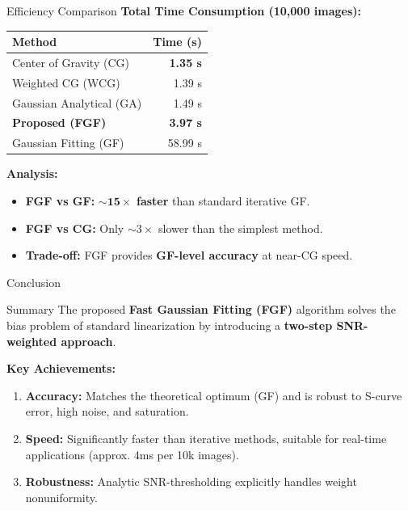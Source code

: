 \begin{frame}{Efficiency Comparison}
    \textbf{Total Time Consumption (10,000 images):}
    
    \begin{table}
        \centering
        \begin{tabular}{lr}
            \toprule
            \textbf{Method} & \textbf{Time (s)} \\
            \midrule
            Center of Gravity (CG) & \textbf{1.35 s} \\
            Weighted CG (WCG) & 1.39 s \\
            Gaussian Analytical (GA) & 1.49 s \\
            \textbf{Proposed (FGF)} & \textbf{3.97 s} \\
            Gaussian Fitting (GF) & 58.99 s \\
            \bottomrule
        \end{tabular}
    \end{table}
    
    \vspace{0.3cm}
    \textbf{Analysis:}
    \begin{itemize}
        \item \textbf{FGF vs GF:} $\sim \mathbf{15\times}$ \textbf{faster} than standard iterative GF.
        \item \textbf{FGF vs CG:} Only $\sim 3\times$ slower than the simplest method.
        \item \textbf{Trade-off:} FGF provides \textbf{GF-level accuracy} at near-CG speed.
    \end{itemize}
\end{frame}

\begin{frame}{Conclusion}
    \begin{block}{Summary}
        The proposed \textbf{Fast Gaussian Fitting (FGF)} algorithm solves the bias problem of standard linearization by introducing a \textbf{two-step SNR-weighted approach}.
    \end{block}
    
    \vspace{0.3cm}
    \textbf{Key Achievements:}
    \begin{enumerate}
        \item \textbf{Accuracy:} Matches the theoretical optimum (GF) and is robust to S-curve error, high noise, and saturation.
        \item \textbf{Speed:} Significantly faster than iterative methods, suitable for real-time applications (approx. 4ms per 10k images).
        \item \textbf{Robustness:} Analytic SNR-thresholding explicitly handles weight nonuniformity.
    \end{enumerate}
    
    \vspace{0.3cm}
    \centering
\end{frame}

